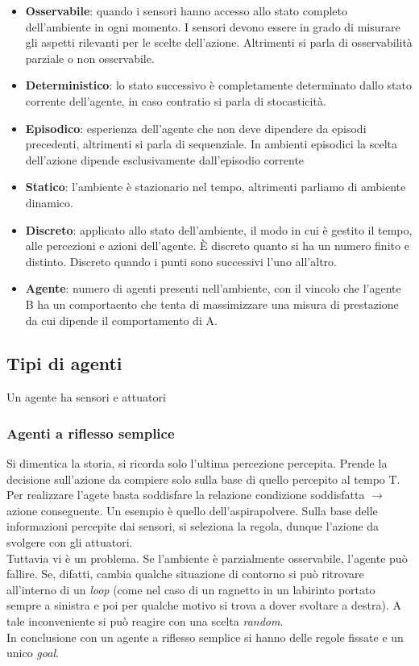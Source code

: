 \documentclass[10pt,a4paper]{book}
\begin{document}
\begin{itemize}
\item \textbf{Osservabile}: quando i sensori hanno accesso allo stato completo dell'ambiente in ogni momento. I sensori devono essere in grado di misurare gli aspetti rilevanti per le scelte dell'azione. Altrimenti si parla di osservabilit\`a parziale o non osservabile.
\item \textbf{Deterministico}: lo stato successivo \`e completamente determinato dallo stato corrente dell'agente, in caso contratio si parla di stocasticit\`a.
\item \textbf{Episodico}: esperienza dell'agente che non deve dipendere da episodi precedenti, altrimenti si parla di sequenziale. In ambienti episodici la scelta dell'azione dipende esclusivamente dall'episodio corrente
\item \textbf{Statico}: l'ambiente \`e stazionario nel tempo, altrimenti parliamo di ambiente dinamico.
\item \textbf{Discreto}: applicato allo stato dell'ambiente, il modo in cui \`e gestito il tempo, alle percezioni e azioni dell'agente. \`E discreto quanto si ha un numero finito e distinto. Discreto quando i punti sono successivi l'uno all'altro.
\item \textbf{Agente}: numero di agenti presenti nell'ambiente, con il vincolo che l'agente B ha un comportaento che tenta di massimizzare una misura di prestazione da cui dipende il comportamento di A.
\end{itemize}
\subsection{Tipi di agenti}
Un agente ha sensori e attuatori
\subsubsection{Agenti a riflesso semplice}
Si dimentica la storia, si ricorda solo l'ultima percezione percepita. Prende la decisione sull'azione da compiere solo sulla base di quello percepito al tempo T.\\
Per realizzare l'agete basta soddisfare la relazione condizione soddisfatta $\rightarrow$ azione conseguente. Un esempio \`e quello dell'aspirapolvere.
Sulla base delle informazioni percepite dai sensori, si seleziona la regola, dunque l'azione da svolgere con gli attuatori.\\
Tuttavia vi \`e un problema. Se l'ambiente \`e parzialmente osservabile, l'agente pu\`o fallire. Se, difatti, cambia qualche situazione di contorno si pu\`o ritrovare all'interno di un \textit{loop} (come nel caso di un ragnetto in un labirinto portato sempre a sinistra e poi per qualche motivo si trova a dover svoltare a destra). A tale inconveniente si pu\`o reagire con una scelta \textit{random}.\\
In conclusione con un agente a riflesso semplice si hanno delle regole fissate e un unico \textit{goal}.
\end{document}
